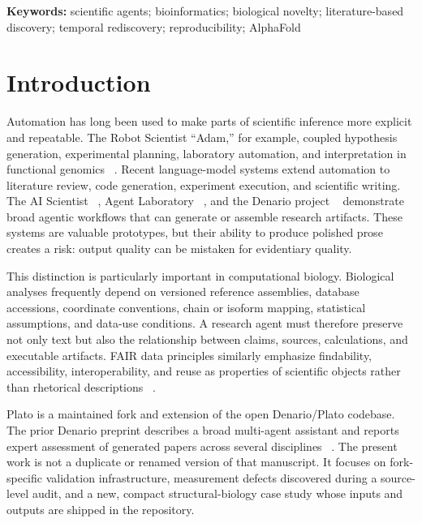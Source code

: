 \documentclass[11pt]{article}
\begin{document}
\textbf{Keywords:} scientific agents; bioinformatics; biological novelty; literature-based discovery; temporal rediscovery; reproducibility; AlphaFold

\section{Introduction}

Automation has long been used to make parts of scientific inference more explicit and repeatable. The Robot Scientist ``Adam,'' for example, coupled hypothesis generation, experimental planning, laboratory automation, and interpretation in functional genomics ~\cite{ref1}. Recent language-model systems extend automation to literature review, code generation, experiment execution, and scientific writing. The AI Scientist ~\cite{ref2}, Agent Laboratory ~\cite{ref3}, and the Denario project ~\cite{ref4} demonstrate broad agentic workflows that can generate or assemble research artifacts. These systems are valuable prototypes, but their ability to produce polished prose creates a risk: output quality can be mistaken for evidentiary quality.

This distinction is particularly important in computational biology. Biological analyses frequently depend on versioned reference assemblies, database accessions, coordinate conventions, chain or isoform mapping, statistical assumptions, and data-use conditions. A research agent must therefore preserve not only text but also the relationship between claims, sources, calculations, and executable artifacts. FAIR data principles similarly emphasize findability, accessibility, interoperability, and reuse as properties of scientific objects rather than rhetorical descriptions ~\cite{ref5}.

Plato is a maintained fork and extension of the open Denario/Plato codebase. The prior Denario preprint describes a broad multi-agent assistant and reports expert assessment of generated papers across several disciplines ~\cite{ref4}. The present work is not a duplicate or renamed version of that manuscript. It focuses on fork-specific validation infrastructure, measurement defects discovered during a source-level audit, and a new, compact structural-biology case study whose inputs and outputs are shipped in the repository.
\end{document}
